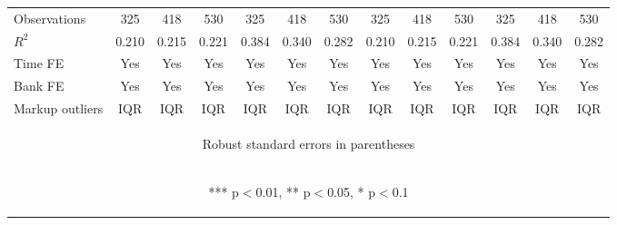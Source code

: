 \documentclass[]{article}
\begin{document}
\begin{center}
\begin{tabular}{lcccccccccccc}
Observations & 325 & 418 & 530 & 325 & 418 & 530 & 325 & 418 & 530 & 325 & 418 & 530 \\
$R^2$ & 0.210 & 0.215 & 0.221 & 0.384 & 0.340 & 0.282 & 0.210 & 0.215 & 0.221 & 0.384 & 0.340 & 0.282 \\
Time FE & Yes & Yes & Yes & Yes & Yes & Yes & Yes & Yes & Yes & Yes & Yes & Yes \\
Bank FE & Yes & Yes & Yes & Yes & Yes & Yes & Yes & Yes & Yes & Yes & Yes & Yes \\
 Markup outliers & IQR & IQR & IQR & IQR & IQR & IQR & IQR & IQR & IQR & IQR & IQR & IQR \\ \hline
\multicolumn{13}{c}{\begin{footnotesize} Robust standard errors in parentheses\end{footnotesize}} \\
\multicolumn{13}{c}{\begin{footnotesize} *** p$<$0.01, ** p$<$0.05, * p$<$0.1\end{footnotesize}} \\
\end{tabular}
\end{center}
\end{document}
